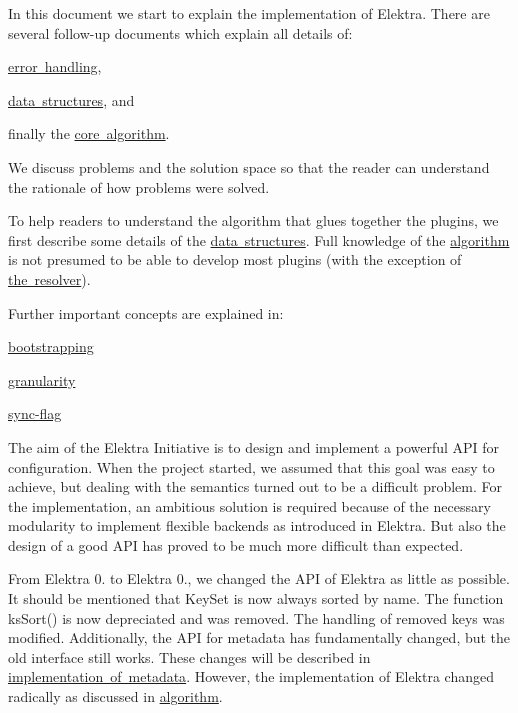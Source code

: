 In this document we start to explain the implementation of Elektra. There are several follow-\/up documents which explain all details of\+:


\begin{DoxyItemize}
\item \mbox{\hyperlink{doc_dev_error-handling_md}{error handling}},
\item \mbox{\hyperlink{doc_dev_data-structures_md}{data structures}}, and
\item finally the \mbox{\hyperlink{doc_dev_algorithm_md}{core algorithm}}.
\end{DoxyItemize}

We discuss problems and the solution space so that the reader can understand the rationale of how problems were solved.

To help readers to understand the algorithm that glues together the plugins, we first describe some details of the \mbox{\hyperlink{doc_dev_data-structures_md}{data structures}}. Full knowledge of the \mbox{\hyperlink{doc_dev_algorithm_md}{algorithm}} is not presumed to be able to develop most plugins (with the exception of \mbox{\hyperlink{autotoc_md618_src_plugins_resolver_README_md}{the resolver}}).

Further important concepts are explained in\+:


\begin{DoxyItemize}
\item \mbox{\hyperlink{doc_help_elektra-bootstrapping_md}{bootstrapping}}
\item \mbox{\hyperlink{doc_help_elektra-granularity_md}{granularity}}
\item \mbox{\hyperlink{doc_help_elektra-sync-flag_md}{sync-\/flag}}
\end{DoxyItemize}

The aim of the Elektra Initiative is to design and implement a powerful A\+PI for configuration. When the project started, we assumed that this goal was easy to achieve, but dealing with the semantics turned out to be a difficult problem. For the implementation, an ambitious solution is required because of the necessary modularity to implement flexible backends as introduced in Elektra. But also the design of a good A\+PI has proved to be much more difficult than expected.

From Elektra 0. to Elektra 0., we changed the A\+PI of Elektra as little as possible. It should be mentioned that {\ttfamily Key\+Set} is now always sorted by name. The function {\ttfamily ks\+Sort()} is now depreciated and was removed. The handling of removed keys was modified. Additionally, the A\+PI for metadata has fundamentally changed, but the old interface still works. These changes will be described in \mbox{\hyperlink{doc_dev_metadata_md}{implementation of metadata}}. However, the implementation of Elektra changed radically as discussed in \mbox{\hyperlink{doc_dev_algorithm_md}{algorithm}}.

